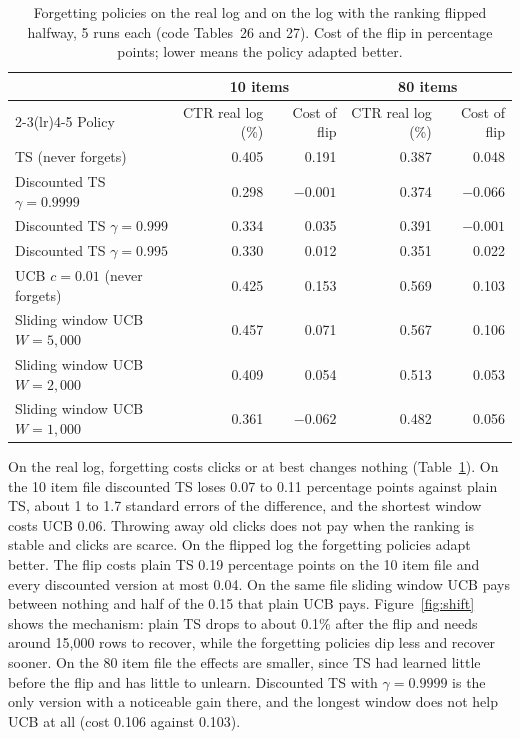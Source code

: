 \documentclass[11pt]{article}
\begin{document}
\begin{table}[H]
  \centering
  \caption{Forgetting policies on the real log and on the log with the ranking
    flipped halfway, 5 runs each (code Tables~26 and 27). Cost of the flip in
    percentage points; lower means the policy adapted better.}
  \label{tab:g}
  \small
  \begin{tabular}{lrrrr}
    \toprule
    & \multicolumn{2}{c}{10 items} & \multicolumn{2}{c}{80 items} \\
    \cmidrule(lr){2-3}\cmidrule(lr){4-5}
    Policy & CTR real log (\%) & Cost of flip & CTR real log (\%) & Cost of flip \\
    \midrule
    TS (never forgets)                 & 0.405 &  0.191 & 0.387 &  0.048 \\
    Discounted TS $\gamma=0.9999$      & 0.298 & $-0.001$ & 0.374 & $-0.066$ \\
    Discounted TS $\gamma=0.999$       & 0.334 &  0.035 & 0.391 & $-0.001$ \\
    Discounted TS $\gamma=0.995$       & 0.330 &  0.012 & 0.351 &  0.022 \\
    UCB $c=0.01$ (never forgets)       & 0.425 &  0.153 & 0.569 &  0.103 \\
    Sliding window UCB $W=5{,}000$     & 0.457 &  0.071 & 0.567 &  0.106 \\
    Sliding window UCB $W=2{,}000$     & 0.409 &  0.054 & 0.513 &  0.053 \\
    Sliding window UCB $W=1{,}000$     & 0.361 & $-0.062$ & 0.482 &  0.056 \\
    \bottomrule
  \end{tabular}
\end{table}

On the real log, forgetting costs clicks or at best changes nothing
(Table~\ref{tab:g}). On the 10 item file discounted TS loses 0.07 to 0.11
percentage points against plain TS, about 1 to 1.7 standard errors of the
difference, and the shortest window costs UCB 0.06. Throwing away old clicks does not pay when
the ranking is stable and clicks are scarce. On the flipped log the forgetting
policies adapt better. The flip costs plain TS 0.19 percentage points on the
10 item file and every discounted version at most 0.04. On the same file
sliding window UCB pays between nothing and half of the 0.15 that plain UCB
pays. Figure~\ref{fig:shift} shows the mechanism: plain TS drops to about
0.1\% after the flip and needs around 15{,}000 rows to recover, while the
forgetting policies dip less and recover sooner. On the 80 item file the
effects are smaller, since TS had learned little before the flip and has
little to unlearn. Discounted TS with $\gamma=0.9999$ is the only version
with a noticeable gain there, and the longest window does not help UCB at
all (cost 0.106 against 0.103).
\end{document}
